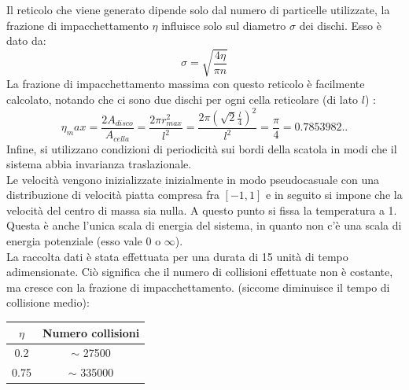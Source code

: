 Il reticolo che viene generato dipende solo dal numero di particelle utilizzate, la frazione di impacchettamento $\eta$ influisce solo sul diametro $\sigma$ dei dischi. Esso è dato da:
$$
	\sigma = \sqrt{\frac{4 \eta}{ \pi n}}
$$
La frazione di impacchettamento massima con questo reticolo è facilmente calcolato, notando che ci sono due dischi per ogni cella reticolare (di lato $l$) :
$$
	\eta_max = \frac{ 2 A_{disco}}{A_{cella}} = \frac{2 \pi r_{max}^2}{l^2} = \frac{2 \pi (\sqrt{2} \frac{l}{4})^2}{l^2} = \frac{\pi}{4} = 0.7853982..
$$
Infine, si utilizzano condizioni di periodicità sui bordi della scatola in modi che il sistema abbia invarianza traslazionale.\\
Le velocità vengono inizializzate inizialmente in modo pseudocasuale con una distribuzione di velocità piatta compresa fra $[-1,1]$ e in seguito si impone che la velocità del centro di massa sia nulla. 
A questo punto si fissa la temperatura a 1. Questa è anche l'unica scala di energia del sistema, in quanto non c'è una scala di energia potenziale (esso vale $0$ o $\infty$).\\
La raccolta dati è stata effettuata per una durata di 15 unità di tempo adimensionate. Ciò significa che il numero di collisioni effettuate non è costante, ma cresce con la frazione di impacchettamento. (siccome diminuisce il tempo di collisione medio):
\begin{center}

\begin{tabular}{c c}
\toprule
	$\eta$ & Numero collisioni \\
	\midrule
	0.2 & $\sim$ 27500 \\
	0.75 & $\sim$ 335000 \\
	\bottomrule
\end{tabular}
\end{center}

